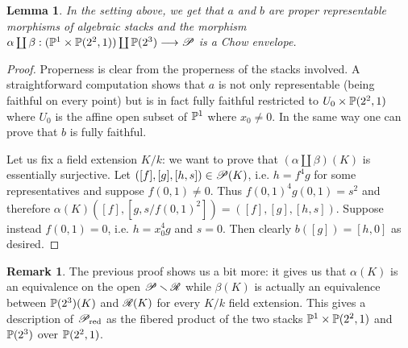 \documentclass[a4paper, 10pt]{amsart}
\numberwithin{equation}{section}
\numberwithin{subsection}{section}
\newtheorem{lemma}[theorem]{Lemma}
\theoremstyle{definition}
\newtheorem{remark}[theorem]{Remark}
\theoremstyle{remark}
\renewcommand{\setminus}{\smallsetminus}
\begin{document}
	\begin{lemma}
		In the setting above, we get that $a$ and $b$ are proper representable morphisms of algebraic stacks and the morphism $\alpha \coprod \beta:(\mathbb{P}^1 \times \mathbb{P}(2^2,1)) \coprod \mathbb{P}(2^3) \longrightarrow \mathscr{P}$ is a Chow envelope.
	\end{lemma}
	
	\begin{proof}
		Properness is clear from the properness of the stacks involved. A straightforward computation shows that $a$ is not only representable (being faithful on every point) but is in fact fully faithful restricted to $U_0 \times \mathbb{P}(2^2,1)$ where $U_0$ is the affine open subset of $\mathbb{P}^1$ where $x_0\neq 0$. In the same way one can prove that $b$ is fully faithful. 
		
		Let us fix a field extension $K/k$: we want to prove that $(\alpha \coprod \beta) (K)$ is essentially surjective. Let $([f],[g],[h,s]) \in \mathscr{P}(K)$, i.e. $h=f^4g$ for some representatives and suppose $f(0,1)\neq 0$. Thus $f(0,1)^4g(0,1)=s^2$ and therefore $\alpha(K)([f],[g,s/f(0,1)^2])=([f],[g],[h,s])$. Suppose instead $f(0,1)=0$, i.e. $h=x_0^4g$ and $s=0$. Then clearly $b([g])=[h,0]$ as desired. 
	\end{proof}
	
	\begin{remark}
		The previous proof shows us a bit more: it gives us that $\alpha(K)$ is an equivalence on the open $\cP \setminus \cR$ while $\beta(K)$ is actually an equivalence between $\mathbb{P}(2^3)(K)$ and $\mathscr{R}(K)$ for every $K/k$ field extension. This gives a description of $\mathscr{P}_{\rm red}$ as the fibered product of the two stacks $\mathbb{P}^1 \times \mathbb{P}(2^2,1)$ and $\mathbb{P}(2^3)$ over $\mathbb{P}(2^2,1)$.
	\end{remark}
	
\end{document}
